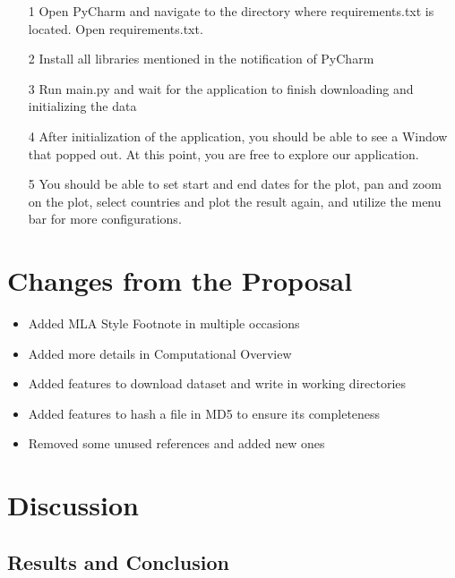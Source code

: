 \documentclass[fontsize=11pt]{article}
\begin{document}
    \begin{enumerate}
        \item [1]
            Open PyCharm and navigate to the directory where requirements.txt is located. Open requirements.txt.

        \item [2]
            Install all libraries mentioned in the notification of PyCharm

        \item [3]
            Run main.py and wait for the application to finish downloading and initializing the data

        \item [4]
            After initialization of the application, you should be able to see a Window that popped out. At this point, you are free to explore our application.

        \item [5]
            You should be able to set start and end dates for the plot, pan and zoom on the plot, select countries and plot the result again, and utilize the menu bar for more configurations.

    \end{enumerate}

    \section{Changes from the Proposal}

    \begin{itemize}
        \item Added MLA Style Footnote in multiple occasions
        \item Added more details in Computational Overview
        \item Added features to download dataset and write in working directories
        \item Added features to hash a file in MD5 to ensure its completeness
        \item Removed some unused references and added new ones
    \end{itemize}

    \section{Discussion}

    \subsection{Results and Conclusion}
\end{document}
